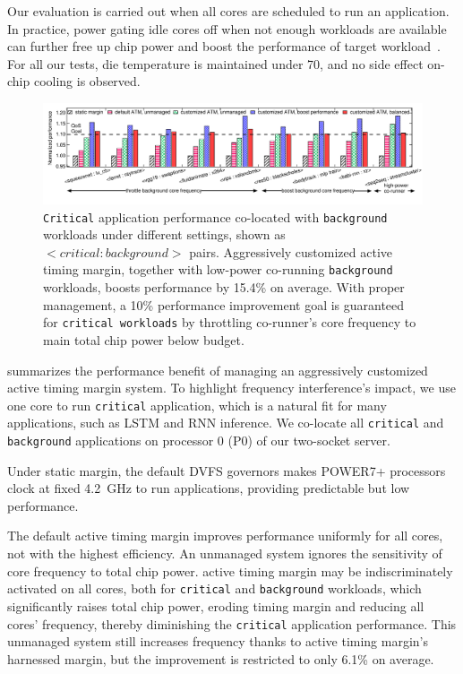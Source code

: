 Our evaluation is carried out when all cores are scheduled to run an application. In practice, power gating idle cores off when not enough workloads are available can further free up chip power and boost the performance of target workload~\cite{zu2015adaptive}. For all our tests, die temperature is maintained under 70\C, and no side effect on-chip cooling is observed. 

\begin{figure}
  \centering
  \includegraphics[trim=10 30 0 0,clip,width=\linewidth]{graphs/process//schedule-1t.pdf}
  \caption{\texttt{Critical} application performance co-located with \texttt{background} workloads under different settings, shown as $<\!critical:background\!>$ pairs. Aggressively customized active timing margin, together with low-power co-running \texttt{background} workloads, boosts performance by 15.4\% on average. With proper management, a 10\% performance improvement goal is guaranteed for \texttt{critical workloads} by throttling co-runner's core frequency to main total chip power below budget.}
  \label{fig:schedule-1t-results}
\end{figure}

 summarizes the performance benefit of managing an aggressively customized active timing margin system. To highlight frequency interference's impact, we use one core to run \texttt{critical} application, which is a natural fit for many applications, such as LSTM and RNN inference. We co-locate all \texttt{critical} and \texttt{background} applications on processor 0 (P0) of our two-socket server.

Under static margin, the default DVFS governors makes POWER7+ processors clock at fixed 4.2~GHz to run applications, providing predictable but low performance. 

The default active timing margin improves performance uniformly for all cores, not with the highest efficiency. An unmanaged system ignores the sensitivity of core frequency to total chip power. active timing margin may be indiscriminately activated on all cores, both for \texttt{critical} and \texttt{background} workloads, which significantly raises total chip power, eroding timing margin and reducing all cores' frequency, thereby diminishing the \texttt{critical} application performance. This unmanaged system still increases frequency thanks to active timing margin's harnessed margin, but the improvement is restricted to only 6.1\% on average.

